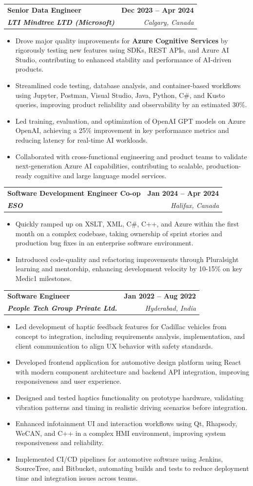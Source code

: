 \documentclass[letterpaper,11pt]{article}
\makeatletter
\newcommand{\resumeItem}[1]{
  \item\small{
    {#1 \vspace{-2pt}}
  }
}
\newcommand{\resumeSubheading}[4]{
  \vspace{-2pt}\item
    \begin{tabular*}{1.0\textwidth}[t]{l@{\extracolsep{\fill}}r}
      \textbf{#1} & \textbf{\small #2} \\
      \textit{\small#3} & \textit{\small #4} \\
    \end{tabular*}\vspace{-7pt}
}
\newcommand{\resumeItemListStart}{\begin{itemize}}
\newcommand{\resumeItemListEnd}{\end{itemize}\vspace{-5pt}}
\makeatother
\begin{document}
    \resumeSubheading
      {\textbf{Senior Data Engineer}}{\textbf{Dec 2023 -- Apr 2024}}
      {\textbf{LTI Mindtree LTD (Microsoft)}}{Calgary, Canada}
      \resumeItemListStart
        \resumeItem{Drove major quality improvements for \textbf{Azure Cognitive Services} by rigorously testing new features using SDKs, REST APIs, and Azure AI Studio, contributing to enhanced stability and performance of AI-driven products.}
        \resumeItem{Streamlined code testing, database analysis, and container-based workflows using Jupyter, Postman, Visual Studio, Java, Python, C\#, and Kusto queries, improving product reliability and observability by an estimated 30\%.}
        \resumeItem{Led training, evaluation, and optimization of OpenAI GPT models on Azure OpenAI, achieving a 25\% improvement in key performance metrics and reducing latency for real-time AI workloads.}
        \resumeItem{Collaborated with cross-functional engineering and product teams to validate next-generation Azure AI capabilities, contributing to scalable, production-ready cognitive and large language model services.}
      \resumeItemListEnd
    
    \resumeSubheading
      {\textbf{Software Development Engineer Co-op}}{\textbf{Jan 2024 -- Apr 2024}}
      {\textbf{ESO}}{Halifax, Canada}
      \resumeItemListStart
        \resumeItem{Quickly ramped up on XSLT, XML, C\#, C++, and Azure within the first month on a complex codebase, taking ownership of sprint stories and production bug fixes in an enterprise software environment.}
        \resumeItem{Introduced code-quality and refactoring improvements through Pluralsight learning and mentorship, enhancing development velocity by 10-15\% on key Medic1 milestones.}
      \resumeItemListEnd

    \resumeSubheading
      {\textbf{Software Engineer}}{\textbf{Jan 2022 -- Aug 2022}}
      {\textbf{People Tech Group Private Ltd.}}{Hyderabad, India}
      \resumeItemListStart
        \resumeItem{Led development of haptic feedback features for Cadillac vehicles from concept to integration, including requirements analysis, implementation, and client communication to align UX behavior with safety standards.}
        \resumeItem{Developed frontend application for automotive design platform using React with modern component architecture and backend API integration, improving responsiveness and user experience.}
        \resumeItem{Designed and tested haptics functionality on prototype hardware, validating vibration patterns and timing in realistic driving scenarios before integration.}
        \resumeItem{Enhanced infotainment UI and interaction workflows using Qt, Rhapsody, WeCAN, and C++ in a complex HMI environment, improving system responsiveness and reliability.}
        \resumeItem{Implemented CI/CD pipelines for automotive software using Jenkins, SourceTree, and Bitbucket, automating builds and tests to reduce deployment time and integration issues across teams.}
      \resumeItemListEnd
\end{document}
